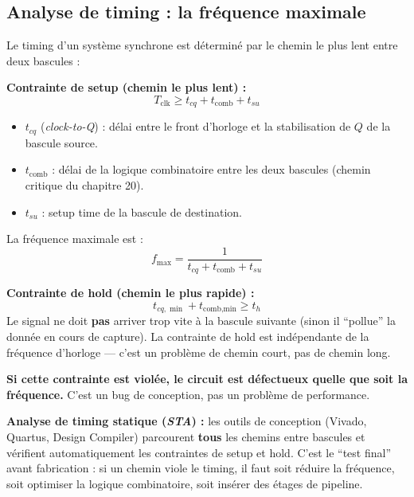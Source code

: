 \documentclass[12pt,a4paper,twoside]{book}
\begin{document}
\subsection{Analyse de timing : la fréquence maximale}

Le timing d'un système synchrone est déterminé par le chemin le plus lent entre deux bascules :

\begin{formule}
\textbf{Contrainte de setup (chemin le plus lent) :}
\[
\boxed{T_{\text{clk}} \geq t_{cq} + t_{\text{comb}} + t_{su}}
\]
\begin{itemize}[nosep]
\item $t_{cq}$ (\textit{clock-to-Q}) : délai entre le front d'horloge et la stabilisation de $Q$ de la bascule source.
\item $t_{\text{comb}}$ : délai de la logique combinatoire entre les deux bascules (chemin critique du chapitre 20).
\item $t_{su}$ : setup time de la bascule de destination.
\end{itemize}

La fréquence maximale est :
\[
\boxed{f_{\max} = \frac{1}{t_{cq} + t_{\text{comb}} + t_{su}}}
\]
\end{formule}

\begin{formule}
\textbf{Contrainte de hold (chemin le plus rapide) :}
\[
\boxed{t_{cq,\min} + t_{\text{comb,min}} \geq t_h}
\]
Le signal ne doit \textbf{pas} arriver trop vite à la bascule suivante (sinon il ``pollue'' la donnée en cours de capture). La contrainte de hold est indépendante de la fréquence d'horloge --- c'est un problème de chemin court, pas de chemin long.

\textbf{Si cette contrainte est violée, le circuit est défectueux quelle que soit la fréquence.} C'est un bug de conception, pas un problème de performance.
\end{formule}

\begin{pratique}
\textbf{Analyse de timing statique (\textit{STA}) :} les outils de conception (Vivado, Quartus, Design Compiler) parcourent \textbf{tous} les chemins entre bascules et vérifient automatiquement les contraintes de setup et hold. C'est le ``test final'' avant fabrication : si un chemin viole le timing, il faut soit réduire la fréquence, soit optimiser la logique combinatoire, soit insérer des étages de pipeline.
\end{pratique}
\end{document}
